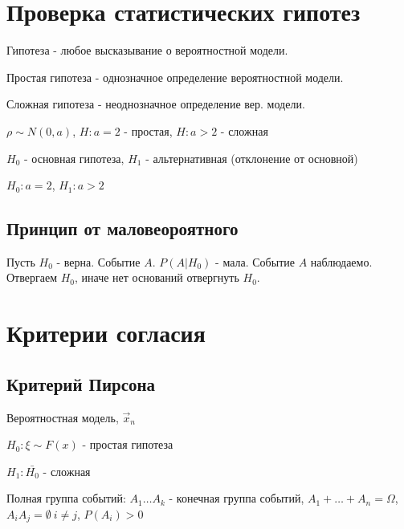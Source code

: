 \documentclass{article}
\begin{document}
\section{Проверка статистических гипотез}
\begin{definition}
  Гипотеза - любое высказывание о вероятностной модели.
\end{definition}
\begin{definition}
  Простая гипотеза - однозначное определение вероятностной модели.
\end{definition}
\begin{definition}
  Сложная гипотеза - неоднозначное определение вер. модели.
\end{definition}
$\rho \sim N(0,a)$, $H:a=2$ - простая, $H:a>2$ - сложная
\begin{definition}
  $H_0$ - основная гипотеза, $H_1$ - альтернативная (отклонение от основной)
\end{definition}
$H_0:a=2$, $H_1:a>2$

\subsection{Принцип от маловеороятного}
Пусть $H_0$ - верна. Событие $A$. $P(A|H_0)$ - мала. Событие $A$ наблюдаемо.
Отвергаем $H_0$, иначе нет оснований отвергнуть $H_0$.


\section{Критерии согласия}
\subsection{Критерий Пирсона}
Вероятностная модель, $\vec{x}_n$

$H_0: \xi \sim F(x)$ - простая гипотеза

$H_1: \bar{H_0}$ - сложная 

Полная группа событий: $A_1\dots A_k$ - конечная группа событий, $A_1+\dots + A_n=\Omega$,
$A_iA_j = \emptyset \ i\neq j$, $P(A_i)>0$
\end{document}
